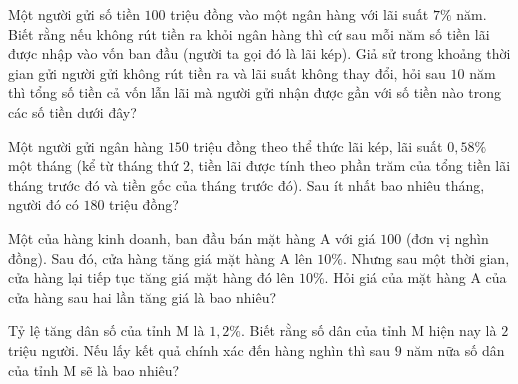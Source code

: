 \begin{vd}%
	Một người gửi số tiền $100$ triệu đồng vào một ngân hàng với lãi suất $7 \%$ năm. Biết rằng nếu không rút tiền ra khỏi ngân hàng thì cứ sau mỗi năm số tiền lãi được nhập vào vốn ban đầu (người ta gọi đó là lãi kép). Giả sử trong khoảng thời gian gửi người gửi không rút tiền ra và lãi suất không thay đổi, hỏi sau $10$ năm thì tổng số tiền cả vốn lẫn lãi mà người gửi nhận được gần với số tiền nào trong các số tiền dưới đây?
\end{vd}
\begin{vd}%
	Một người gửi ngân hàng $150$ triệu đồng theo thể thức lãi kép, lãi suất $0,58 \%$ một tháng (kể từ tháng thứ $2$, tiền lãi được tính theo phần trăm của tổng tiền lãi tháng trước đó và tiền gốc của tháng trước đó). Sau ít nhất bao nhiêu tháng, người đó có $180$ triệu đồng?
\end{vd}
\begin{vd}%
	Một của hàng kinh doanh, ban đầu bán mặt hàng A với giá $100$ (đơn vị nghìn đồng). Sau đó, cửa hàng tăng giá mặt hàng A lên $10 \%$. Nhưng sau một thời gian, cửa hàng lại tiếp tục tăng giá mặt hàng đó lên $10 \%$. Hỏi giá của mặt hàng A của cửa hàng sau hai lần tăng giá là bao nhiêu?
\end{vd}
\begin{vd}%
	Tỷ lệ tăng dân số của tỉnh M là $1,2 \%$. Biết rằng số dân của tỉnh M hiện nay là $2$ triệu người. Nếu lấy kết quả chính xác đến hàng nghìn thì sau $9$ năm nữa số dân của tỉnh M sẽ là bao nhiêu?
\end{vd}
